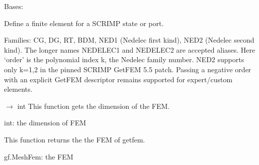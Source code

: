 \documentclass[letterpaper,10pt,english]{sphinxmanual}
\begin{document}
\begin{fulllineitems}
\label{\detokenize{scrimp:scrimp.fem.FEM}}
\pysigstartsignatures
\pysiglinewithargsret
{}
{\sphinxparamcomma {}\sphinxparamcomma {}}
{}
\pysigstopsignatures
\sphinxAtStartPar
Bases: 

\sphinxAtStartPar
Define a finite element for a SCRIMP state or port.

\sphinxAtStartPar
Families: CG, DG, RT, BDM, NED1 (Nedelec first kind),
NED2 (Nedelec second kind). The longer names NEDELEC1 and
NEDELEC2 are accepted aliases. Here ‘order’ is the polynomial
index k,  the Nedelec family number. NED2 supports only
k=1,2 in the pinned SCRIMP GetFEM 5.5 patch.
Passing a negative order with an explicit GetFEM descriptor
remains supported for expert/custom elements.

\begin{fulllineitems}
\label{\detokenize{scrimp:scrimp.fem.FEM.get_dim}}
\pysigstartsignatures
\pysiglinewithargsret
{}
{}
{{ $\rightarrow$ int}}
\pysigstopsignatures
\sphinxAtStartPar
This function gets the dimension of the FEM.
\begin{description}
\sphinxAtStartPar
int: the dimension of FEM

\end{description}

\end{fulllineitems}


\begin{fulllineitems}
\label{\detokenize{scrimp:scrimp.fem.FEM.get_fem}}
\pysigstartsignatures
\pysiglinewithargsret
{}
{}
{}
\pysigstopsignatures
\sphinxAtStartPar
This function returns the the FEM of getfem.
\begin{description}
\sphinxAtStartPar
gf.MeshFem: the FEM


\end{description}
\end{fulllineitems}
\end{fulllineitems}
\end{document}
